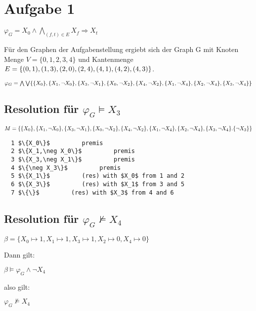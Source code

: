 \section*{Aufgabe 1}

$\varphi_G = X_0 \wedge \bigwedge\limits_{(f,t) \in E} X_f \Rightarrow X_t$

Für den Graphen der Aufgabenstellung ergiebt sich 
der Graph G mit Knoten Menge $V = \{0,1,2,3,4\}$ und Kantenmenge  $E = \\ \{(0,1),(1,3),(2,0),(2,4),(4,1),(4,2),(4,3)\} $.


$\varphi_G = \bigwedge\bigvee \{\{X_0\}
,\{X_1,\neg X_0\} 
,\{X_3,\neg X_1\} 
,\{X_0,\neg X_2\} \\
,\{X_4,\neg X_2\}
,\{X_1,\neg X_4\}
,\{X_2,\neg X_4\}
,\{X_3,\neg X_4\}
\}$

\subsection*{Resolution für $\varphi_G \vDash X_3$}

$M = \{\{X_0\}
,\{X_1,\neg X_0\} 
,\{X_3,\neg X_1\} 
,\{X_0,\neg X_2\} \\
,\{X_4,\neg X_2\}
,\{X_1,\neg X_4\}
,\{X_2,\neg X_4\}
,\{X_3,\neg X_4\}
.\{\neg X_3\}
\}$

\begin{lstlisting}
  1 $\{X_0\}$         premis 
  2 $\{X_1,\neg X_0\}$         premis
  3 $\{X_3,\neg X_1\}$         premis
  4 $\{\neg X_3\}$         premis
  5 $\{X_1\}$         (res) with $X_0$ from 1 and 2
  6 $\{X_3\}$         (res) with $X_1$ from 3 and 5
  7 $\{\}$         (res) with $X_3$ from 4 and 6
\end{lstlisting}


\subsection*{Resolution für $\varphi_G \not\vDash X_4 $} 

$\beta = \{X_0 \mapsto 1,X_1 \mapsto 1,X_3 \mapsto 1,X_2 \mapsto  0,X_4 \mapsto 0\}$

Dann gilt:

$\beta \vDash \varphi_G \wedge \neg X_4$

also gilt:

$\varphi_G \not\vDash X_4$

